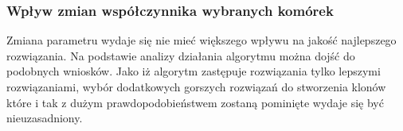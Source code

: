 \documentclass[a4paper]{article}
\begin{document}
\subsubsection{Wpływ zmian współczynnika wybranych komórek}
Zmiana parametru wydaje się nie mieć większego wpływu na jakość najlepszego rozwiązania.  Na podstawie analizy działania algorytmu można dojść do podobnych wniosków. Jako iż algorytm zastępuje rozwiązania tylko lepszymi rozwiązaniami, wybór dodatkowych gorszych rozwiązań do stworzenia klonów które i tak z dużym prawdopodobieństwem zostaną pominięte wydaje się być nieuzasadniony.


\newpage
\printbibliography
\end{document}
